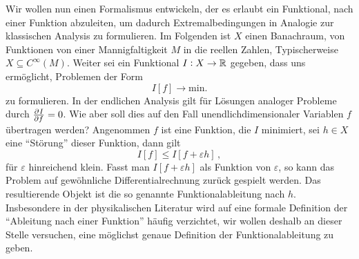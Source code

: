 Wir wollen nun einen Formalismus entwickeln, der es erlaubt ein Funktional, nach
einer Funktion abzuleiten, um dadurch Extremalbedingungen in
Analogie zur klassischen Analysis zu formulieren.
Im Folgenden ist $X$ einen Banachraum, von Funktionen von einer Mannigfaltigkeit
$M$ in die reellen Zahlen, Typischerweise $X\subseteq C^\infty(M)$.
Weiter sei ein Funktional $I:X\to\mathbb{R}$ gegeben, dass uns ermöglicht, Problemen
der Form
\begin{equation}
I[f]\to \mathrm{min.}
\end{equation}
zu formulieren. In der endlichen Analysis gilt für Lösungen analoger
Probleme durch $\pd{I}{f}=0$.
Wie aber soll dies auf den Fall unendlichdimensionaler Variablen $f$ übertragen
werden?
Angenommen $f$ ist eine Funktion, die $I$ minimiert, sei $h\in X$ eine
"`Störung"' dieser Funktion, dann gilt
\begin{equation}
I[f]\leq I[f+\varepsilon h]\,,
\end{equation}
für $\varepsilon$ hinreichend klein. Fasst man $I[f+\varepsilon h]$ als Funktion
von $\varepsilon$, so kann das Problem auf gewöhnliche Differentialrechnung
zurück gespielt werden.
Das resultierende Objekt ist die so genannte Funktionalableitung nach $h$.
Insbesondere in der physikalischen Literatur wird auf
eine formale Definition der "`Ableitung nach einer Funktion"' häufig verzichtet, wir
wollen deshalb an dieser Stelle versuchen, eine möglichst genaue Definition der
Funktionalableitung zu geben.
